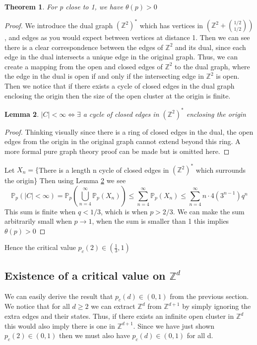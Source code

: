 \documentclass[a4paper,11pt]{article}
\newtheorem{theorem}{Theorem}[section]
\newtheorem{lemma}[theorem]{Lemma}
\theoremstyle{definition}
\newcommand{\ints}{\mathbb{Z}}
\newcommand{\ztwodual}{(\ints^2)^*}
\newcommand{\prob}{\mathbb{P}_p}
\begin{document}
\begin{theorem}
	For p close to 1, we have $\theta(p) > 0$
\end{theorem}
\begin{proof}
	We introduce the dual graph $(\ints^2)^*$ which has vertices in $(\ints^2 + \binom{1/2}{1/2} )$, and edges as you would expect between vertices at distance 1.
	Then we can see there is a clear correspondence between the edges of $\ints^2$ and its dual, since each edge in the dual intersects a unique edge in the original graph. 
	Thus, we can create a mapping from the open and closed edges of $\ints^2$ to the dual graph, where the edge in the dual is open if and only if the intersecting edge in $\ints^2$ is open.\\
	Then we notice that if there exists a cycle of closed edges in the dual graph enclosing the origin then the size of the open cluster at the origin is finite. 
	\begin{lemma}\label{originloop}
		$|C| < \infty \iff \exists$ a cycle of closed edges in $(\ints^2)^*$  enclosing the origin
	\end{lemma}
	\begin{proof}
		{Thinking visually since there is a ring of closed edges in the dual, the open edges from the origin in the original graph cannot extend beyond this ring. A more formal pure graph theory proof can be made but is omitted here.}
	\end{proof}
	Let $X_n = \{$There is a length n cycle of closed edges in $\ztwodual$ which surrounds the origin\}
	Then using Lemma \ref{originloop} we see
	$$\prob(|C| < \infty) = \prob(\bigcup_{n=4}^\infty \prob(X_n)) \leq \sum_{n=4}^\infty \prob(X_n) \leq \sum_{n=4}^\infty n \cdot 4(3^{n-1})q^n$$
	This sum is finite when $q<1/3$, which is when $p>2/3$. We can make the sum arbitrarily small when $p \rightarrow 1$, when the sum is smaller than 1 this implies $\theta(p) > 0$
\end{proof}
Hence the critical value $p_c(2) \in (\frac{1}{3},1)$




\subsection {Existence of a critical value on $\ints^d$}
We can easily derive the result that $p_c(d)\in (0,1)$ from the previous section. 
We notice that for all $d\geq 2$ we can extract $\ints^d$ from $\ints^{d+1}$ by simply ignoring the extra edges and their states.
Thus, if there exists an infinite open cluster in $\ints^d$ this would also imply there is one in $\ints^{d+1}$.
Since we have just shown $p_c(2) \in (0,1)$ then we must also have $p_c(d) \in (0,1)$ for all d.
\end{document}
